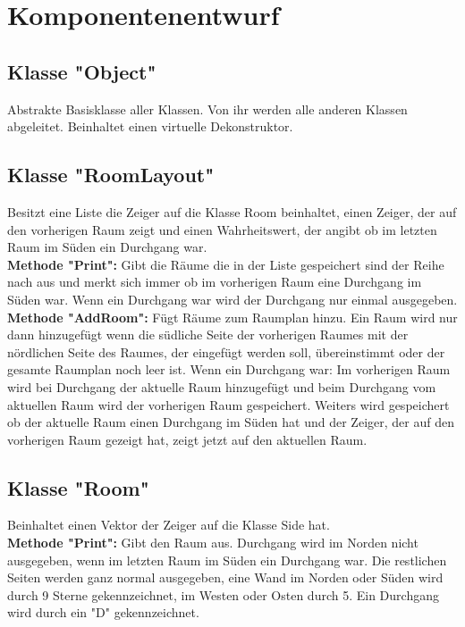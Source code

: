 \documentclass[12pt,a4paper]{article}
\begin{document}
\newpage
\section {Komponentenentwurf}
\subsection {Klasse "Object"}
Abstrakte Basisklasse aller Klassen. Von ihr werden alle anderen Klassen abgeleitet. Beinhaltet einen virtuelle Dekonstruktor.

\subsection {Klasse "RoomLayout"}
Besitzt eine Liste die Zeiger auf die Klasse Room beinhaltet, einen Zeiger, der auf den vorherigen Raum zeigt und einen Wahrheitswert, der angibt ob im letzten Raum im Süden ein Durchgang war. \\

\textbf {Methode "Print": } 
Gibt die Räume die in der Liste gespeichert sind der Reihe nach aus und merkt sich immer ob im vorherigen Raum eine Durchgang im Süden war. Wenn ein Durchgang war wird der Durchgang nur einmal ausgegeben. \\

\textbf {Methode "AddRoom":}
Fügt Räume zum Raumplan hinzu. Ein Raum wird nur dann hinzugefügt wenn die südliche Seite der vorherigen Raumes mit der nördlichen Seite des Raumes, der eingefügt werden soll, übereinstimmt oder der gesamte Raumplan noch leer ist. Wenn ein Durchgang war: Im vorherigen Raum wird bei Durchgang der aktuelle Raum hinzugefügt und beim Durchgang vom aktuellen Raum wird der vorherigen Raum gespeichert.
Weiters wird gespeichert ob der aktuelle Raum einen Durchgang im Süden hat und der Zeiger, der auf den vorherigen Raum gezeigt hat, zeigt jetzt auf den aktuellen Raum. \\

\subsection {Klasse "Room"}
Beinhaltet einen Vektor der Zeiger auf die Klasse Side hat.\\

\textbf {Methode "Print":} 
Gibt den Raum aus. Durchgang wird im Norden nicht ausgegeben, wenn im letzten Raum im Süden ein Durchgang war. Die restlichen Seiten werden ganz normal ausgegeben, eine Wand im Norden oder Süden wird durch 9 Sterne gekennzeichnet, im Westen oder Osten durch 5. Ein Durchgang wird durch ein "D" gekennzeichnet. \\
\end{document}
